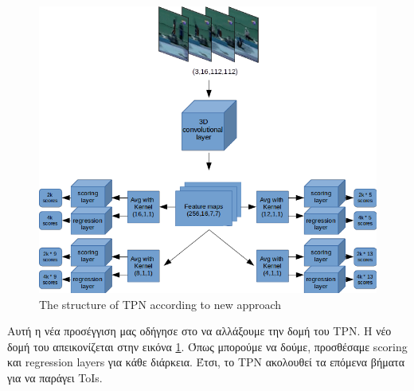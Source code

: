 \documentclass{report}
\begin{document}
\begin{figure}[h]
  \centering
  \includegraphics[scale=0.4]{tpn_2}
  \caption{The structure of TPN according to new approach}
  \label{fig:New_structure}
\end{figure}
Αυτή η νέα προσέγγιση μας οδήγησε στο να αλλάξουμε την δομή του TPN. Η νέο δομή του απεικονίζεται στην εικόνα  \ref{fig:New_structure}. Όπως
μπορούμε να δούμε, προσθέσαμε scoring και regression layers για κάθε διάρκεια. Έτσι, το TPN ακολουθεί τα επόμενα βήματα για να παράγει ToIs.
\end{document}
